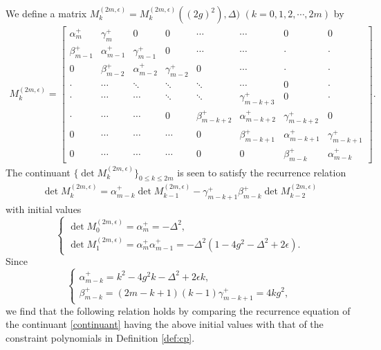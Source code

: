 \documentclass[11pt]{article}
\numberwithin{equation}{section}
\theoremstyle{plain}
\theoremstyle{definition}
\theoremstyle{remark}
\begin{document}
We define a matrix $M^{(2m,\epsilon)}_k=M_k^{(2m,\epsilon)}((2g)^2), \Delta)$ $(k=0,1,2,\cdots,2m)$ by 
\begin{align*}
M^{(2m,\epsilon)}_k=
\begin{bmatrix}
\alpha_{m}^+ & \gamma_{m}^+ &0&0& \cdots& \cdots & 0 &0 \\
\beta_{m-1}^+& \alpha_{m-1}^+ & \gamma_{m-1}^+ &0& \cdots&\cdots & \cdot & \cdot \\
0& \beta_{m-2}^+ & \alpha_{m-2}^+ & \gamma_{m-2}^+ &0& \cdots &\cdot & \cdot \\
\cdot& \cdots&\ddots& \ddots & \ddots& \cdots & 0& \cdot\\
\cdot& \cdots&\cdots& \ddots & \ddots& \gamma_{m-k+3}^+& 0& \cdot\\
\cdot& \cdots&\cdots& 0& \beta_{m-k+2}^+ & \alpha_{m-k+2}^+ & \gamma_{m-k+2}^+ & 0\\
0 & \cdots&\cdots& \cdots & 0& \beta_{m-k+1}^+ & \alpha_{m-k+1}^+ & \gamma_{m-k+1}^+ \\
0 & \cdots &\cdots& \cdots & 0 & 0 & \beta_{m-k}^+ & \alpha_{m-k}^+
\end{bmatrix}.
\end{align*}
The continuant $\{\det M^{(2m,\epsilon)}_k\}_{0\leq k\leq 2m}$ %
is seen to satisfy the recurrence relation
\begin{align}\label{continuant}
\det M^{(2m,\epsilon)}_k 
=  \alpha_{m-k}^+ \det M^{(2m,\epsilon)}_{k-1}-\gamma_{m-k+1}^+\beta_{m-k}^+\det M^{(2m,\epsilon)}_{k-2}
\end{align}
with initial values 
\begin{equation*}
\begin{cases}
\det M^{(2m,\epsilon)}_{0}=\alpha_m^+=-\Delta^2, \\
\det M^{(2m,\epsilon)}_{1}=\alpha_m^+\alpha_{m-1}^+=-\Delta^2(1-4g^2-\Delta^2+2\epsilon).
\end{cases}
\end{equation*}
Since 
\begin{equation*}
\begin{cases}
\alpha_{m-k}^+=k^2-4g^2k-\Delta^2+2\epsilon k,\\
\beta_{m-k}^+=(2m-k+1)(k-1) %
\gamma_{m-k+1}^+=4kg^2,
\end{cases}
\end{equation*}
we find that the following relation holds by comparing the recurrence equation of the continuant \eqref{continuant} having the above initial values with that of the constraint polynomials in Definition \ref{def:cp}.
\end{document}
